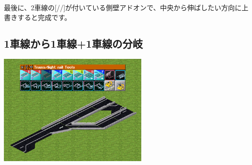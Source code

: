 \documentclass{jbook}
\begin{document}
  最後に、2車線の[//]が付いている側壁アドオンで、中央から伸ばしたい方向に上書きすると完成です。

\newpage

\subsection{1車線から1車線+1車線の分岐}
\label{sub:1to1and1}

\includegraphics[width = 75mm]{picture/20210214-road-2-8.png}
\end{document}
